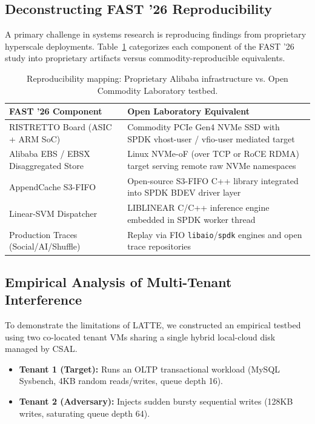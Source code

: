 \documentclass[10pt,twocolumn]{article}
\begin{document}
\subsection{Deconstructing FAST '26 Reproducibility}
A primary challenge in systems research is reproducing findings from proprietary hyperscale deployments. Table~\ref{tab:repro_mapping} categorizes each component of the FAST '26 study into proprietary artifacts versus commodity-reproducible equivalents.

\begin{table}[h]
\centering
\caption{Reproducibility mapping: Proprietary Alibaba infrastructure vs. Open Commodity Laboratory testbed.}
\label{tab:repro_mapping}
\small
\begin{tabular}{p{2.6cm}p{4.8cm}}
\toprule
\textbf{FAST '26 Component} & \textbf{Open Laboratory Equivalent} \\
\midrule
RISTRETTO Board (ASIC + ARM SoC) & Commodity PCIe Gen4 NVMe SSD with SPDK vhost-user / vfio-user mediated target \\
Alibaba EBS / EBSX Disaggregated Store & Linux NVMe-oF (over TCP or RoCE RDMA) target serving remote raw NVMe namespaces \\
AppendCache S3-FIFO & Open-source S3-FIFO C++ library integrated into SPDK BDEV driver layer~\cite{yang2023fifo} \\
Linear-SVM Dispatcher & LIBLINEAR C/C++ inference engine~\cite{fan2008liblinear} embedded in SPDK worker thread \\
Production Traces (Social/AI/Shuffle) & Replay via FIO \texttt{libaio}/\texttt{spdk} engines and open trace repositories \\
\bottomrule
\end{tabular}
\end{table}

\subsection{Empirical Analysis of Multi-Tenant Interference}
To demonstrate the limitations of LATTE, we constructed an empirical testbed using two co-located tenant VMs sharing a single hybrid local-cloud disk managed by CSAL. 
\begin{itemize}
    \item \textbf{Tenant 1 (Target):} Runs an OLTP transactional workload (MySQL Sysbench, 4KB random reads/writes, queue depth 16).
    \item \textbf{Tenant 2 (Adversary):} Injects sudden bursty sequential writes (128KB writes, saturating queue depth 64).
\end{itemize}
\end{document}
